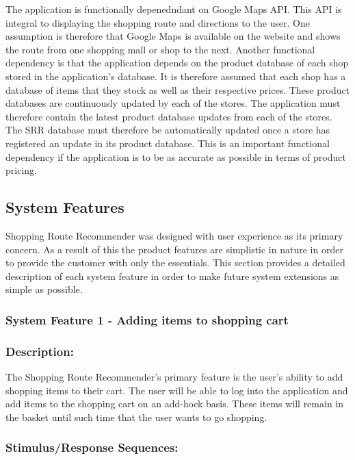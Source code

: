 \documentclass[10pt,twocolumn]{witseiepaper}
\begin{document}
		The application is functionally depenedndant on Google Maps API. This API is integral to displaying the shopping route and directions to the user. One assumption is therefore that Google Maps is available on the website and shows the route from one shopping mall or shop to the next. Another functional dependency is that the application depends on the product database of each shop stored in the application's database. It is therefore assumed that each shop has a database of items that they stock as well as their respective prices. These product databases are continuously updated by each of the stores. The application must therefore contain the latest product database updates from each of the stores. The SRR database must therefore be automatically updated once a store has registered an update in its product database. This is an important functional dependency if the application is to be as accurate as possible in terms of product pricing. 
		
		\subsection{System Features}
		
		Shopping Route Recommender was designed with user experience as its primary concern. As a result of this the product features are simplistic in nature in order to provide the customer with only the essentials.	This section provides a detailed description of each system feature in order to make future system extensions as simple as possible. 
		
		\subsubsection{System Feature 1 - Adding items to shopping cart}
		\label{featureadd}
		
		\subsubsection*{Description:}
		
		The Shopping Route Recommender's primary feature is the user's ability to add shopping items to their cart. The user will be able to log into the application and add items to the shopping cart on an add-hock basis. These items will remain in the basket until such time that the user wants to go shopping. 
		
		\subsubsection*{Stimulus/Response Sequences:}
		
\end{document}
